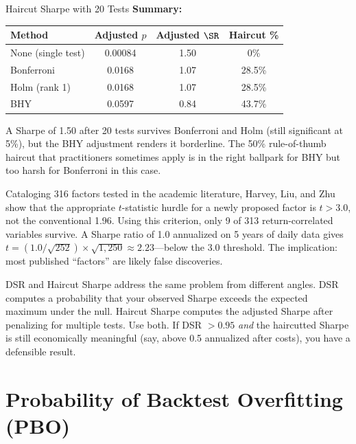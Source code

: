 \begin{workedexample}{Haircut Sharpe with 20 Tests}
\textbf{Summary:}
\begin{center}
\begin{tabular}{lccc}
\toprule
\textbf{Method} & \textbf{Adjusted $p$} & \textbf{Adjusted $\SR$} & \textbf{Haircut \%} \\
\midrule
None (single test) & 0.00084 & 1.50 & 0\% \\
Bonferroni & 0.0168 & 1.07 & 28.5\% \\
Holm (rank 1) & 0.0168 & 1.07 & 28.5\% \\
BHY & 0.0597 & 0.84 & 43.7\% \\
\bottomrule
\end{tabular}
\end{center}
A Sharpe of 1.50 after 20 tests survives Bonferroni and Holm (still significant at 5\%), but the BHY adjustment renders it borderline. The 50\% rule-of-thumb haircut that practitioners sometimes apply is in the right ballpark for BHY but too harsh for Bonferroni in this case.
\end{workedexample}

\begin{keyresult}
Cataloging 316 factors tested in the academic literature, Harvey, Liu, and Zhu show that the appropriate $t$-statistic hurdle for a newly proposed factor is $t > 3.0$, not the conventional 1.96. Using this criterion, only 9 of 313 return-correlated variables survive. A Sharpe ratio of 1.0 annualized on 5 years of daily data gives $t = (1.0/\sqrt{252}) \times \sqrt{1{,}250} \approx 2.23$---below the 3.0 threshold. The implication: most published ``factors'' are likely false discoveries.
\end{keyresult}

\begin{keyidea}
DSR and Haircut Sharpe address the same problem from different angles. DSR computes a probability that your observed Sharpe exceeds the expected maximum under the null. Haircut Sharpe computes the adjusted Sharpe after penalizing for multiple tests. Use both. If DSR $> 0.95$ \emph{and} the haircutted Sharpe is still economically meaningful (say, above 0.5 annualized after costs), you have a defensible result.
\end{keyidea}

\section{Probability of Backtest Overfitting (PBO)}
\label{sec:pbo}


